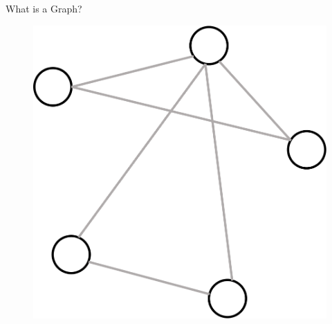 \documentclass[
    11pt, %
    aspectratio=169, %
]{beamer}
\begin{document}
\begin{frame}{What is a Graph?}
    \begin{figure}
        \centering
        \includegraphics[scale=.625]{Images/graph.png}
    \end{figure}
\end{frame}
\end{document}
